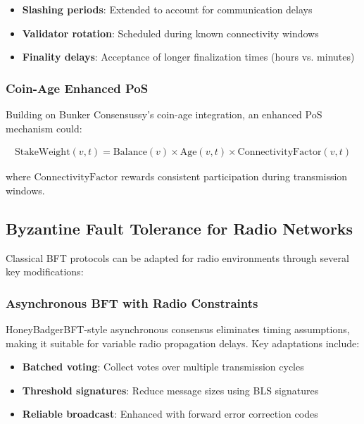 \documentclass[11pt,a4paper]{article}
\begin{document}
\begin{itemize}
\item \textbf{Slashing periods}: Extended to account for communication delays
\item \textbf{Validator rotation}: Scheduled during known connectivity windows
\item \textbf{Finality delays}: Acceptance of longer finalization times (hours vs. minutes)
\end{itemize}

\subsubsection{Coin-Age Enhanced PoS}

Building on Bunker Consensussy's coin-age integration, an enhanced PoS mechanism could:

\begin{align}
\text{StakeWeight}(v, t) = \text{Balance}(v) \times \text{Age}(v, t) \times \text{ConnectivityFactor}(v, t)
\end{align}

where $\text{ConnectivityFactor}$ rewards consistent participation during transmission windows.

\subsection{Byzantine Fault Tolerance for Radio Networks}

Classical BFT protocols can be adapted for radio environments through several key modifications:

\subsubsection{Asynchronous BFT with Radio Constraints}

HoneyBadgerBFT-style asynchronous consensus eliminates timing assumptions, making it suitable for variable radio propagation delays. Key adaptations include:

\begin{itemize}
\item \textbf{Batched voting}: Collect votes over multiple transmission cycles
\item \textbf{Threshold signatures}: Reduce message sizes using BLS signatures
\item \textbf{Reliable broadcast}: Enhanced with forward error correction codes
\end{itemize}
\end{document}
